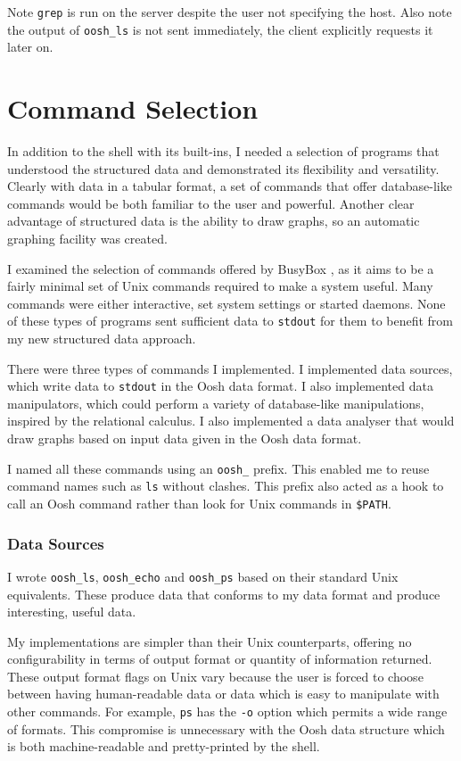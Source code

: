 \documentclass[12pt,twoside,notitlepage]{report}
\begin{document}
Note {\tt grep} is run on the server despite the user not specifying
the host. Also note the output of {\tt oosh\_ls} is not sent
immediately, the client explicitly requests it later on.

\section{Command Selection}
In addition to the shell with its built-ins, I needed a selection of programs
that understood the structured data and demonstrated its flexibility and
versatility. Clearly with data in a tabular format, a set of commands that offer
database-like commands would be both familiar to the user and powerful. Another
clear advantage of structured data is the ability to draw graphs, so an
automatic graphing facility was created.

I examined the selection of commands offered by BusyBox
\cite{busybox}, as it aims to be a fairly minimal set of Unix commands
required to make a system useful. Many commands were either
interactive, set system settings or started daemons. None of these
types of programs sent sufficient data to {\tt stdout} for them to benefit from my
new structured data approach.

There were three types of commands I implemented. I implemented data
sources, which write data to {\tt stdout} in the Oosh data format. I
also implemented data manipulators, which could perform a variety of
database-like manipulations, inspired by the relational calculus. I
also implemented a data analyser that would draw graphs based on input
data given in the Oosh data format.

I named all these commands using an {\tt oosh\_} prefix. This enabled me
to reuse command names such as {\tt ls} without clashes. This
prefix also acted as a hook to call an Oosh command rather than look
for Unix commands in {\tt \$PATH}.

\subsubsection{Data Sources}
I wrote {\tt oosh\_ls}, {\tt oosh\_echo} and {\tt oosh\_ps} based on their
standard Unix equivalents. These produce data that conforms to my data
format and produce interesting, useful data. 

My implementations are simpler than their Unix counterparts, offering
no configurability in terms of output format or quantity of
information returned. These output format flags on Unix vary because
the user is forced to choose between having human-readable data or
data which is easy to manipulate with other commands. For example,
{\tt ps} has the {\tt -o} option which permits a wide range of
formats. This compromise is unnecessary with the Oosh data structure
which is both machine-readable and pretty-printed by the shell.
\end{document}
